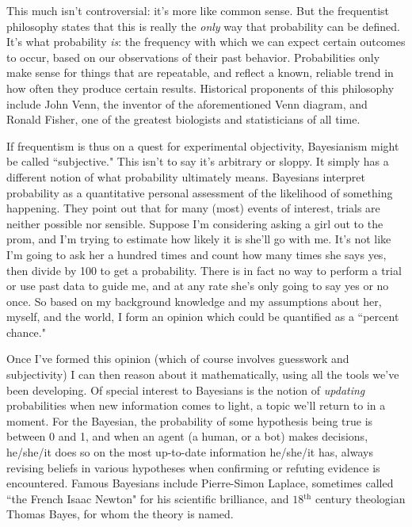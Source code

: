 This much isn't controversial: it's more like common sense. But the
frequentist philosophy states that this is really the \textit{only} way
that probability can be defined. It's what probability \textit{is}: the
frequency with which we can expect certain outcomes to occur, based on our
observations of their past behavior. Probabilities only make sense for
things that are repeatable, and reflect a known, reliable trend in how
often they produce certain results. Historical proponents of this
philosophy include John Venn, the inventor of the aforementioned Venn
diagram, and Ronald Fisher, one of the greatest biologists and
statisticians of all time.

If frequentism is thus on a quest for experimental objectivity, Bayesianism
might be called ``subjective." This isn't to say it's arbitrary or sloppy.
It simply has a different notion of what probability ultimately means.
Bayesians interpret probability as a quantitative personal assessment of
the likelihood of something happening. They point out that for many (most)
events of interest, trials are neither possible nor sensible. Suppose I'm
considering asking a girl out to the prom, and I'm trying to estimate how
likely it is she'll go with me. It's not like I'm going to ask her a
hundred times and count how many times she says yes, then divide by 100 to
get a probability. There is in fact no way to perform a trial or use past
data to guide me, and at any rate she's only going to say yes or no once.
So based on my background knowledge and my assumptions about her, myself,
and the world, I form an opinion which could be quantified as a ``percent
chance."

Once I've formed this opinion (which of course involves guesswork and
subjectivity) I can then reason about it mathematically, using all the
tools we've been developing. Of special interest to Bayesians is the notion
of \textit{updating} probabilities when new information comes to light, a
topic we'll return to in a moment. For the Bayesian, the probability of
some hypothesis being true is between 0 and 1, and when an agent (a human,
or a bot) makes decisions, he/she/it does so on the most up-to-date
information he/she/it has, always revising beliefs in various hypotheses
when confirming or refuting evidence is encountered. Famous Bayesians
include Pierre-Simon Laplace, sometimes called ``the French Isaac Newton"
for his scientific brilliance, and $18{^{\text{th}}}$ century theologian
Thomas Bayes, for whom the theory is named.

